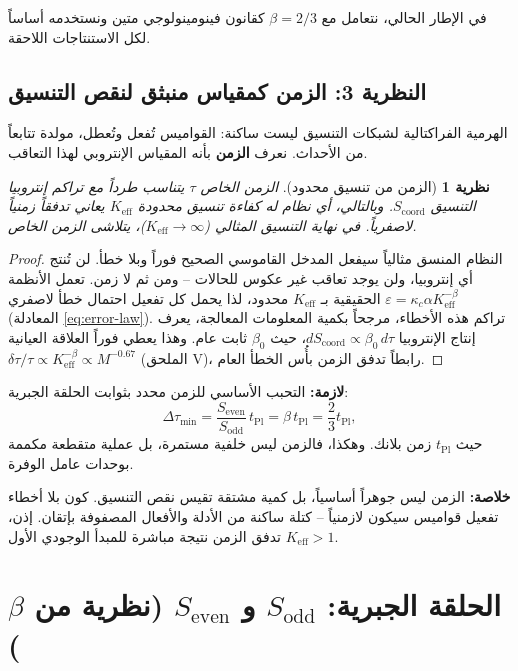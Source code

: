 \documentclass[12pt,a4paper]{article}
\newtheorem{theorem}{نظرية}[section]
\begin{document}
	في الإطار الحالي، نتعامل مع \(\beta = 2/3\) كقانون فينومينولوجي متين ونستخدمه أساساً لكل الاستنتاجات اللاحقة.
	
	\subsection{النظرية 3: الزمن كمقياس منبثق لنقص التنسيق}
	\label{subsec:time-emergence}
	
	الهرمية الفراكتالية لشبكات التنسيق ليست ساكنة: القواميس تُفعل وتُعطل، مولدة تتابعاً من الأحداث. نعرف \textbf{الزمن} بأنه المقياس الإنتروبي لهذا التعاقب.
	
	\begin{theorem}[الزمن من تنسيق محدود]
		\label{thm:time}
		الزمن الخاص \(\tau\) يتناسب طرداً مع تراكم إنتروبيا التنسيق \(S_{\mathrm{coord}}\). وبالتالي، أي نظام له كفاءة تنسيق محدودة \(K_{\mathrm{eff}}\) يعاني تدفقاً زمنياً لاصفرياً. في نهاية التنسيق المثالي (\(K_{\mathrm{eff}} \to \infty\))، يتلاشى الزمن الخاص.
	\end{theorem}
	
	\begin{proof}
		النظام المنسق مثالياً سيفعل المدخل القاموسي الصحيح فوراً وبلا خطأ. لن تُنتج أي إنتروبيا، ولن يوجد تعاقب غير عكوس للحالات – ومن ثم لا زمن. تعمل الأنظمة الحقيقية بـ \(K_{\mathrm{eff}}\) محدود، لذا يحمل كل تفعيل احتمال خطأ لاصفري \(\varepsilon = \kappa_c \alpha K_{\mathrm{eff}}^{-\beta}\) (المعادلة \ref{eq:error-law}). تراكم هذه الأخطاء، مرجحاً بكمية المعلومات المعالجة، يعرف إنتاج الإنتروبيا \(dS_{\mathrm{coord}} \propto \beta_0 \, d\tau\)، حيث \(\beta_0\) ثابت عام. وهذا يعطي فوراً العلاقة العيانية \(\delta\tau/\tau \propto K_{\mathrm{eff}}^{-\beta} \propto M^{-0.67}\) (الملحق V)، رابطاً تدفق الزمن بأُس الخطأ العام.
	\end{proof}
	
	\noindent
	\textbf{لازمة:} التحبب الأساسي للزمن محدد بثوابت الحلقة الجبرية:
	\[
	\Delta \tau_{\min} = \frac{S_{\mathrm{even}}}{S_{\mathrm{odd}}} \, t_{\mathrm{Pl}}
	= \beta \, t_{\mathrm{Pl}} = \frac{2}{3} t_{\mathrm{Pl}},
	\]
	حيث \(t_{\mathrm{Pl}}\) زمن بلانك. وهكذا، فالزمن ليس خلفية مستمرة، بل عملية متقطعة مكممة بوحدات عامل الوفرة.
	
	\noindent
	\textbf{خلاصة:} الزمن ليس جوهراً أساسياً، بل كمية مشتقة تقيس نقص التنسيق. كون بلا أخطاء تفعيل قواميس سيكون لازمنياً – كتلة ساكنة من الأدلة والأفعال المصفوفة بإتقان. إذن، تدفق الزمن نتيجة مباشرة للمبدأ الوجودي الأول \(K_{\mathrm{eff}} > 1\).
	
	\section{الحلقة الجبرية: \(S_{\mathrm{odd}}\) و \(S_{\mathrm{even}}\) (نظرية من \(\beta\))}
	\label{sec:algebraic-loop}
	
\end{document}
